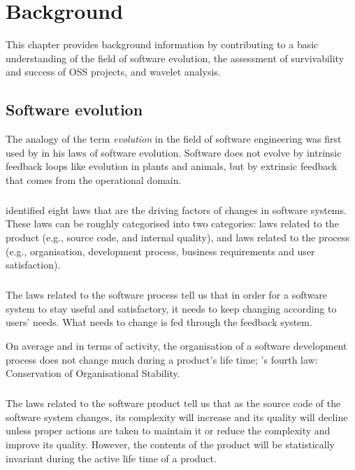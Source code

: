 \chapter{Background}
\label{background}

This chapter provides background information by contributing to a basic
understanding of the field of software evolution, the assessment of
survivability and success of OSS projects, and wavelet analysis.

\section{Software evolution}
The analogy of the term \emph{evolution }\rm in the field of software
engineering was first used by \citet{lehman} in his laws of software evolution.
Software does not evolve by intrinsic feedback loops like evolution in plants
and animals, but by extrinsic feedback that comes from the operational domain.

\paragraph{}
\citeauthor{lehman} identified eight laws that are the driving factors of
changes in software systems. These laws can be roughly categorised into two
categories: laws related to the product (e.g., source code, and internal
quality), and laws related to the process (e.g., organisation, development
process, business requirements and user satisfaction).

\paragraph{}
The laws related to the software process tell us that in order for a software
system to stay useful and satisfactory, it needs to keep changing according to
users' needs. What needs to change is fed through the feedback system.

On average and in terms of activity, the organisation of a software development
process does not change much during a product's life time; \citeauthor{lehman}'s
fourth law: Conservation of Organisational Stability.

\paragraph{}
The laws related to the software product tell us that as the source code of the
software system changes, its complexity will increase and its quality will
decline unless proper actions are taken to maintain it or reduce the complexity
and improve its quality. However, the contents of the product will be
statistically invariant during the active life time of a product.


